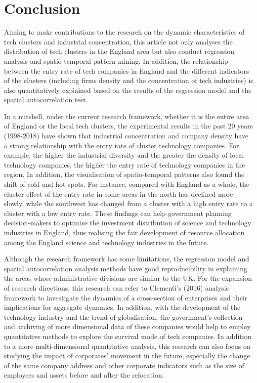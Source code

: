 \documentclass[
  12pt,
  oneside]{book}
\begin{document}
\hypertarget{conclusion-1}{%
\chapter{Conclusion}\label{conclusion-1}}

Aiming to make contributions to the research on the dynamic characteristics of tech clusters and industrial concentration, this article not only analyses the distribution of tech clusters in the England area but also conduct regression analysis and spatio-temporal pattern mining. In addition, the relationship between the entry rate of tech companies in England and the different indicators of the clusters (including firms density and the concentration of tech industries) is also quantitatively explained based on the results of the regression model and the spatial autocorrelation test.

In a nutshell, under the current research framework, whether it is the entire area of England or the local tech clusters, the experimental results in the past 20 years (1998-2018) have shown that industrial concentration and company density have a strong relationship with the entry rate of cluster technology companies. For example, the higher the industrial diversity and the greater the density of local technology companies, the higher the entry rate of technology companies in the region. In addition, the visualisation of spatio-temporal patterns also found the shift of cold and hot spots. For instance, compared with England as a whole, the cluster effect of the entry rate in some areas in the north has declined more slowly, while the southwest has changed from a cluster with a high entry rate to a cluster with a low entry rate. These findings can help government planning decision-makers to optimise the investment distribution of science and technology industries in England, thus realising the fair development of resource allocation among the England science and technology industries in the future.

Although the research framework has some limitations, the regression model and spatial autocorrelation analysis methods have good reproducibility in explaining the areas whose administrative divisions are similar to the UK. For the expansion of research directions, this research can refer to Clementi's (2016) analysis framework to investigate the dynamics of a cross-section of enterprises and their implications for aggregate dynamics. In addition, with the development of the technology industry and the trend of globalisation, the government's collection and archiving of more dimensional data of these companies would help to employ quantitative methods to explore the survival mode of tech companies. In addition to a more multi-dimensional quantitative analysis, this research can also focus on studying the impact of corporates' movement in the future, especially the change of the same company address and other corporate indicators such as the size of employees and assets before and after the relocation.
\end{document}
